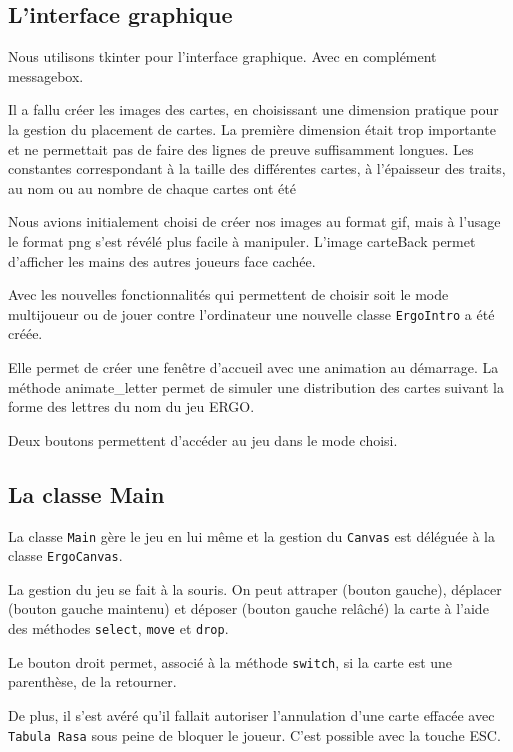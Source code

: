 \documentclass[12pt, algo]{cours}
\begin{document}
\subsection{L'interface graphique}

Nous utilisons tkinter pour l'interface graphique. Avec en complément messagebox.

Il a fallu créer les images des cartes, en choisissant une dimension pratique pour la gestion du placement de cartes. La première dimension était trop importante et ne permettait pas de faire des lignes de preuve suffisamment longues. Les constantes correspondant à la taille des différentes cartes, à l'épaisseur des traits, au nom ou au nombre de chaque cartes ont été 

Nous avions initialement choisi de créer nos images au format gif, mais à l'usage le format png s'est révélé plus facile à manipuler. L'image carteBack permet d'afficher les mains des autres joueurs face cachée.

\smallskip
Avec les nouvelles fonctionnalités qui permettent de choisir soit le mode multijoueur ou de jouer contre l'ordinateur une nouvelle classe \texttt{ErgoIntro} a été créée. 

Elle permet de créer une fenêtre d’accueil avec une animation au démarrage. La méthode animate\_letter permet de simuler une distribution des cartes suivant la forme des lettres du nom du jeu ERGO.

Deux boutons permettent d'accéder au jeu dans le mode choisi.

\subsection{La classe Main}

La classe \texttt{Main} gère le jeu en lui même et la gestion du \texttt{Canvas} est déléguée à la classe \texttt{ErgoCanvas}. 

La gestion du jeu se fait à la souris. On peut attraper (bouton gauche), déplacer (bouton gauche maintenu) et déposer (bouton gauche relâché) la carte à l'aide des méthodes \texttt{select}, \texttt{move} et \texttt{drop}.

Le bouton droit permet, associé à la méthode \texttt{switch}, si la carte est une parenthèse, de la retourner.

De plus, il s'est avéré qu'il fallait autoriser l'annulation d'une carte effacée avec \texttt{Tabula Rasa} sous peine de bloquer le joueur. C'est possible avec la touche ESC.
\end{document}
